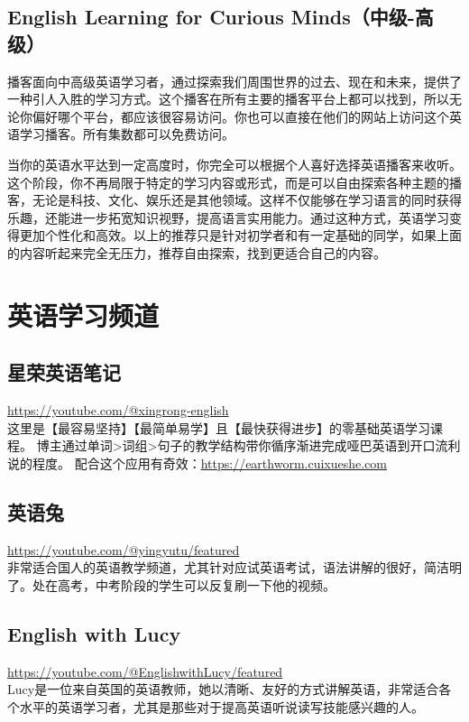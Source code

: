 \documentclass[11pt]{article}
\begin{document}
\subsection{English Learning for Curious Minds（中级-高级）}
\label{sec:orgc63c875}
播客面向中高级英语学习者，通过探索我们周围世界的过去、现在和未来，提供了一种引人入胜的学习方式。这个播客在所有主要的播客平台上都可以找到，所以无论你偏好哪个平台，都应该很容易访问。你也可以直接在他们的网站上访问这个英语学习播客。所有集数都可以免费访问。

当你的英语水平达到一定高度时，你完全可以根据个人喜好选择英语播客来收听。这个阶段，你不再局限于特定的学习内容或形式，而是可以自由探索各种主题的播客，无论是科技、文化、娱乐还是其他领域。这样不仅能够在学习语言的同时获得乐趣，还能进一步拓宽知识视野，提高语言实用能力。通过这种方式，英语学习变得更加个性化和高效。以上的推荐只是针对初学者和有一定基础的同学，如果上面的内容听起来完全无压力，推荐自由探索，找到更适合自己的内容。

\section{英语学习频道}
\label{sec:orgaf549e1}
\subsection{星荣英语笔记}
\label{sec:org9af99ff}
\url{https://youtube.com/@xingrong-english} \\
这里是【最容易坚持】【最简单易学】且【最快获得进步】的零基础英语学习课程。
博主通过单词>词组>句子的教学结构带你循序渐进完成哑巴英语到开口流利说的程度。
配合这个应用有奇效：\url{https://earthworm.cuixueshe.com}

\subsection{英语兔}
\label{sec:orgea0685c}
\url{https://youtube.com/@yingyutu/featured} \\
非常适合国人的英语教学频道，尤其针对应试英语考试，语法讲解的很好，简洁明了。处在高考，中考阶段的学生可以反复刷一下他的视频。

\subsection{English with Lucy}
\label{sec:orga28433e}
\url{https://youtube.com/@EnglishwithLucy/featured} \\
Lucy是一位来自英国的英语教师，她以清晰、友好的方式讲解英语，非常适合各个水平的英语学习者，尤其是那些对于提高英语听说读写技能感兴趣的人。
\end{document}
